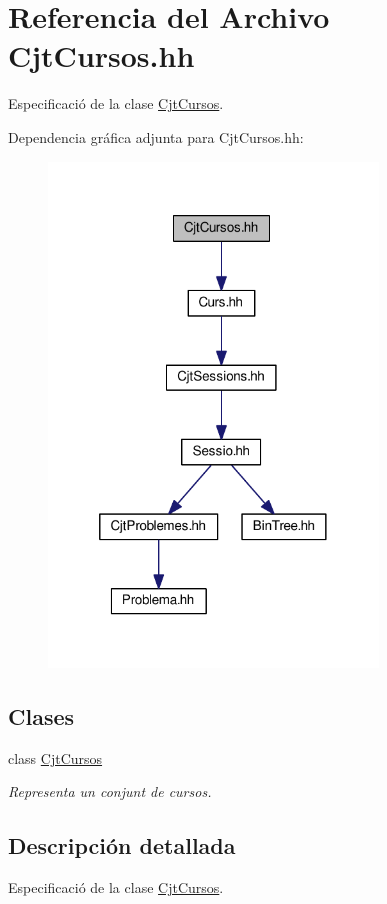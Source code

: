 \hypertarget{_cjt_cursos_8hh}{}\section{Referencia del Archivo Cjt\+Cursos.\+hh}
\label{_cjt_cursos_8hh}


Especificació de la clase \mbox{\hyperlink{class_cjt_cursos}{Cjt\+Cursos}}.  


Dependencia gráfica adjunta para Cjt\+Cursos.\+hh\+:
\nopagebreak
\begin{figure}[H]
\begin{center}
\leavevmode
\includegraphics[width=248pt]{_cjt_cursos_8hh__incl}
\end{center}
\end{figure}
\subsection*{Clases}
\begin{DoxyCompactItemize}
\item 
class \mbox{\hyperlink{class_cjt_cursos}{Cjt\+Cursos}}
\begin{DoxyCompactList}\small\item\em Representa un conjunt de cursos. \end{DoxyCompactList}\end{DoxyCompactItemize}


\subsection{Descripción detallada}
Especificació de la clase \mbox{\hyperlink{class_cjt_cursos}{Cjt\+Cursos}}. 

